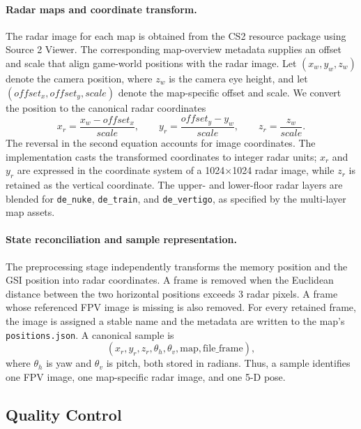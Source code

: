 \paragraph{Radar maps and coordinate transform.}
The radar image for each map is obtained from the CS2 resource package using Source 2 Viewer. The corresponding map-overview metadata supplies an offset and scale that align game-world positions with the radar image.
Let $(x_w,y_w,z_w)$ denote the camera position, where $z_w$ is the camera eye height, and let $(offset_x, offset_y, scale)$ denote the map-specific offset and scale.
We convert the position to the canonical radar coordinates
\begin{equation}
    x_r = \frac{x_w-offset_x}{scale}, \qquad
    y_r = \frac{offset_y-y_w}{scale}, \qquad
    z_r = \frac{z_w}{scale}.
\end{equation}
The reversal in the second equation accounts for image coordinates.
The implementation casts the transformed coordinates to integer radar units; $x_r$ and $y_r$ are expressed in the coordinate system of a 1024$\times$1024 radar image, while $z_r$ is retained as the vertical coordinate.
The upper- and lower-floor radar layers are blended for \texttt{de\_nuke}, \texttt{de\_train}, and \texttt{de\_vertigo}, as specified by the multi-layer map assets.

\paragraph{State reconciliation and sample representation.}
The preprocessing stage independently transforms the memory position and the GSI position into radar coordinates.
A frame is removed when the Euclidean distance between the two horizontal positions exceeds 3 radar pixels.
A frame whose referenced FPV image is missing is also removed.
For every retained frame, the image is assigned a stable name and the metadata are written to the map's \texttt{positions.json}.
A canonical sample is
\begin{equation}
    (x_r,y_r,z_r,\theta_h,\theta_v,\mathrm{map},\mathrm{file\_frame}),
\end{equation}
where $\theta_h$ is yaw and $\theta_v$ is pitch, both stored in radians.
Thus, a sample identifies one FPV image, one map-specific radar image, and one 5-D pose.


\subsection{Quality Control}
\label{subsec:data_filter}

